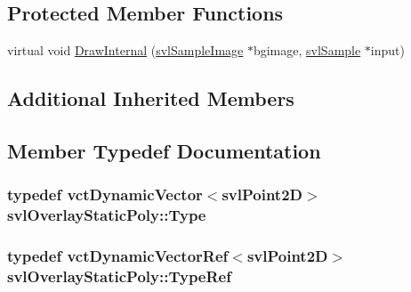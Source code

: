 \subsection*{Protected Member Functions}
\begin{DoxyCompactItemize}
\item 
virtual void \hyperlink{classsvl_overlay_static_poly_a41a22fbb7aa09b6884bc0a74dbf0e9c0}{Draw\-Internal} (\hyperlink{classsvl_sample_image}{svl\-Sample\-Image} $\ast$bgimage, \hyperlink{classsvl_sample}{svl\-Sample} $\ast$input)
\end{DoxyCompactItemize}
\subsection*{Additional Inherited Members}


\subsection{Member Typedef Documentation}
\hypertarget{classsvl_overlay_static_poly_a0c7018bd6af72d2fba86b58f1d966291}{
\subsubsection[{Type}]{\setlength{\rightskip}{0pt plus 5cm}typedef {\bf vct\-Dynamic\-Vector}$<${\bf svl\-Point2\-D}$>$ {\bf svl\-Overlay\-Static\-Poly\-::\-Type}}}\label{classsvl_overlay_static_poly_a0c7018bd6af72d2fba86b58f1d966291}
\hypertarget{classsvl_overlay_static_poly_a2d317856c0cec72b3a76252446a85944}{
\subsubsection[{Type\-Ref}]{\setlength{\rightskip}{0pt plus 5cm}typedef {\bf vct\-Dynamic\-Vector\-Ref}$<${\bf svl\-Point2\-D}$>$ {\bf svl\-Overlay\-Static\-Poly\-::\-Type\-Ref}}}\label{classsvl_overlay_static_poly_a2d317856c0cec72b3a76252446a85944}


